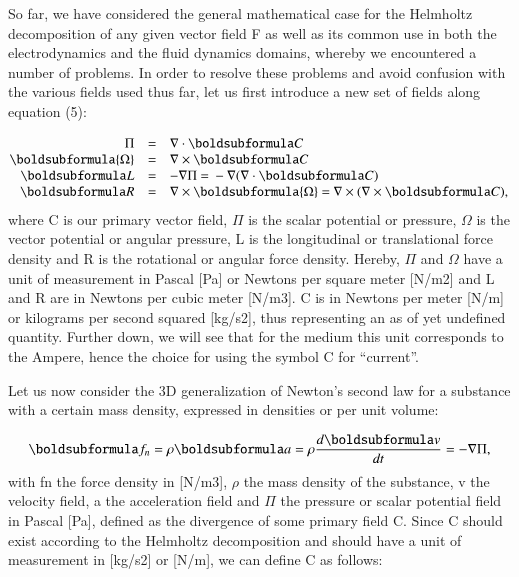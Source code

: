 \documentclass[twoside,final]{article}
\begin{document}
{So far, we have considered the general mathematical case for the Helmholtz
decomposition of any given vector field F as well as its common use in both the
electrodynamics and the fluid dynamics domains, whereby we encountered a number
of problems.  In order to resolve these problems and avoid confusion with the
various fields used thus far, let us first introduce a new set of fields along
equation (5): 

\begin{equation}\label{seq:refText15}
\begin{matrix}\hfill \Pi &=&\nabla \cdot \boldsubformula C\hfill\null \\\hfill \boldsubformula{\Omega }&=&\nabla \times
\boldsubformula C\hfill\null \\\hfill \boldsubformula L&=&-\nabla \Pi \text{ = }-\nabla (\nabla \cdot \boldsubformula
C)\hfill\null \\\hfill \boldsubformula R&=&\nabla \times \boldsubformula{\Omega }\text{ = }\nabla \times (\nabla \times
\boldsubformula C),\hfill\null \end{matrix}
\end{equation}
where C is our primary vector field, $\Pi $ is the scalar potential or pressure,
$\Omega $ is the vector potential or angular pressure, L is the longitudinal or
translational force density and R is the rotational or angular force density.
Hereby, $\Pi $ and $\Omega $ have a unit of measurement in Pascal [Pa] or
Newtons per square meter [N/m2] and L and R are in Newtons per cubic meter
[N/m3]. C is in Newtons per meter [N/m] or kilograms per second squared [kg/s2],
thus representing an as of yet undefined quantity. Further down, we will see
that for the medium this unit corresponds to the Ampere, hence the choice for
using the symbol C for ``current''.

Let us now consider the 3D generalization of Newton's second law for a substance
with a certain mass density, expressed in densities or per unit volume:

\begin{equation}
\boldsubformula f_n=\rho \boldsubformula a=\rho \frac{d\boldsubformula v}{\mathit{dt}}=-{\nabla}\Pi ,
\end{equation}
with fn the force density in [N/m3], $\rho $ the mass density of the substance,
v the velocity field, a the acceleration field and $\Pi $ the pressure or scalar
potential field in Pascal [Pa], defined as the divergence of some primary field
C. Since C should exist according to the Helmholtz decomposition and should have
a unit of measurement in [kg/s2] or [N/m], we can define C as follows:  

}
\end{document}
